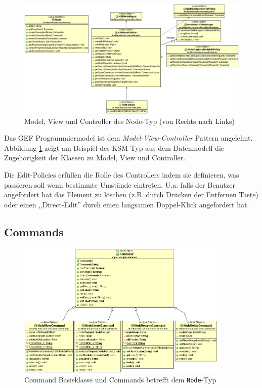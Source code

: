 \documentclass[%
12pt,titlepage,abstracton,DIV=10]{scrreprt}
\begin{document}
\begin{figure}[ht]
\centering
\includegraphics[width=\textwidth]{images/node-edit-and-figure.PNG}
\caption{Model, View und Controller des Node-Typ (von Rechts nach Links)}
\label{fig:node-edit-and-figure}
\end{figure}

Das GEF Programmiermodel ist dem \textit{Model-View-Controller} Pattern
angelehnt. Abbildung \ref{fig:node-edit-and-figure} zeigt am Beispiel des KSM-Typ aus dem Datenmodell
die Zugehörigkeit der Klassen zu Model, View und Controller.

Die Edit-Policies erfüllen die Rolle des Controllers indem sie definieren, was
passieren soll wenn bestimmte Umstände eintreten. U.a. falls der Benutzer
angefordert hat das Element zu löschen (z.B. durch Drücken der Entfernen Taste)
oder einen ,,Direct-Edit'' durch einen langsamen Doppel-Klick angefordert hat.

\subsection{Commands}

\begin{figure}[ht]
\centering
\includegraphics[width=0.9\textwidth]{images/commands.PNG}
\caption{Command Basisklasse und Commands betrefft dem \texttt{Node}-Typ}
\label{fig:commands}
\end{figure}
\end{document}
